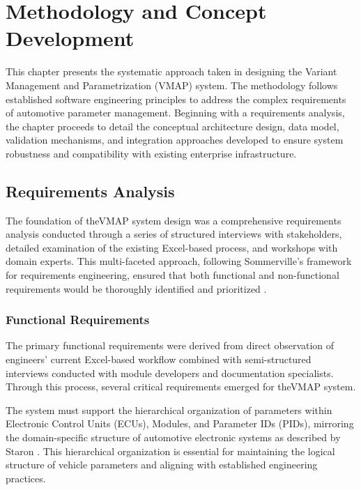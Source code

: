 \chapter{Methodology and Concept Development}
\label{chap:methodology}

This chapter presents the systematic approach taken in designing the Variant Management and Parametrization (VMAP) system. The methodology follows established software engineering principles to address the complex requirements of automotive parameter management. Beginning with a requirements analysis, the chapter proceeds to detail the conceptual architecture design, data model, validation mechanisms, and integration approaches developed to ensure system robustness and compatibility with existing enterprise infrastructure.

\section{Requirements Analysis}
\label{sec:requirements-analysis}

The foundation of the\ac{VMAP} system design was a comprehensive requirements analysis conducted through a series of structured interviews with stakeholders, detailed examination of the existing Excel-based process, and workshops with domain experts. This multi-faceted approach, following Sommerville's framework for requirements engineering, ensured that both functional and non-functional requirements would be thoroughly identified and prioritized \cite{sommerville2011software}.

\subsection{Functional Requirements}
\label{subsec:functional-requirements}

The primary functional requirements were derived from direct observation of engineers' current Excel-based workflow combined with semi-structured interviews conducted with module developers and documentation specialists. Through this process, several critical requirements emerged for the\ac{VMAP} system.

The system must support the hierarchical organization of parameters within Electronic Control Units (ECUs), Modules, and Parameter IDs (PIDs), mirroring the domain-specific structure of automotive electronic systems as described by Staron \cite{staron2021automotive}. This hierarchical organization is essential for maintaining the logical structure of vehicle parameters and aligning with established engineering practices.

